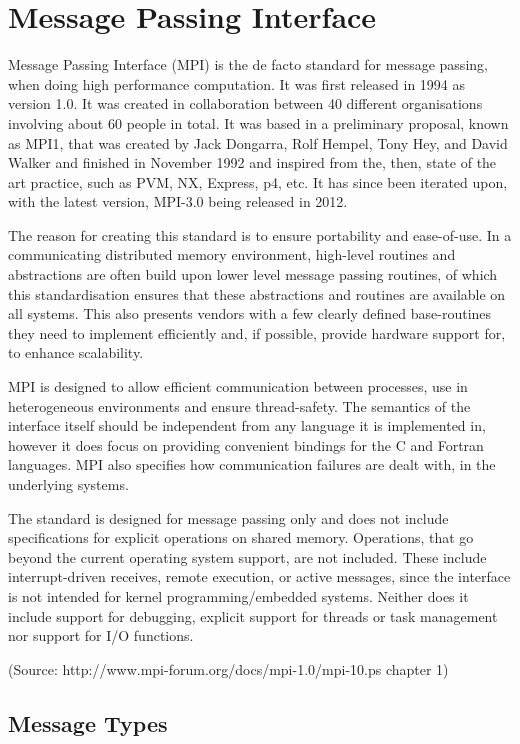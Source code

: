 \section{Message Passing Interface}
Message Passing Interface (MPI) is the de facto standard for message passing, when doing high performance computation. It was first released in 1994 as version 1.0. It was created in collaboration between 40 different organisations involving about 60 people in total. It was based in a preliminary proposal, known as MPI1, that was created by Jack Dongarra, Rolf Hempel, Tony Hey, and David Walker and finished in November 1992 and inspired from the, then, state of the art practice, such as PVM, NX, Express, p4, etc. It has since been iterated upon, with the latest version, MPI-3.0 being released in 2012.

The reason for creating this standard is to ensure portability and ease-of-use. In a communicating distributed memory environment, high-level routines and abstractions are often build upon lower level message passing routines, of which this standardisation ensures that these abstractions and routines are available on all systems. This also presents vendors with a few clearly defined base-routines they need to implement efficiently and, if possible, provide hardware support for, to enhance scalability.

MPI is designed to allow efficient communication between processes, use in heterogeneous environments and ensure thread-safety. The semantics of the interface itself should be independent from any language it is implemented in, however it does focus on providing convenient bindings for the C and Fortran languages. MPI also specifies how communication failures are dealt with, in the underlying systems.

The standard is designed for message passing only and does not include specifications for explicit operations on shared memory. Operations, that go beyond the current operating system support, are not included. These include interrupt-driven receives, remote execution, or active messages, since the interface is not intended for kernel programming/embedded systems. Neither does it include support for debugging, explicit support for threads or task management nor support for I/O functions.

(Source: http://www.mpi-forum.org/docs/mpi-1.0/mpi-10.ps chapter 1)

\subsection{Message Types}

